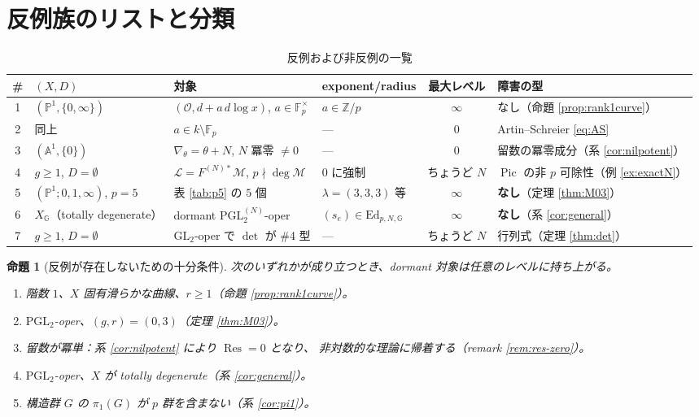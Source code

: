 \documentclass[a4paper,11pt]{ltjsarticle}
\theoremstyle{plain}
\newtheorem{proposition}[theorem]{命題}
\theoremstyle{definition}
\newcommand{\bbA}{\mathbb{A}}
\newcommand{\bbP}{\mathbb{P}}
\newcommand{\bbZ}{\mathbb{Z}}
\newcommand{\bbF}{\mathbb{F}}
\newcommand{\cL}{\mathcal{L}}
\newcommand{\cM}{\mathcal{M}}
\newcommand{\cO}{\mathcal{O}}
\newcommand{\Res}{\operatorname{Res}}
\newcommand{\Pic}{\operatorname{Pic}}
\newcommand{\dlog}{d\!\log}
\begin{document}
\section{反例族のリストと分類}\label{sec:list}

\begin{table}[htbp]
\centering
\caption{反例および非反例の一覧}
\label{tab:examples}
\small
\begin{tabular}{clllcl}
\toprule
\# & $(X,D)$ & 対象 & exponent/radius & 最大レベル & 障害の型\\
\midrule
1 & $(\bbP^1,\{0,\infty\})$ & $(\cO,d+a\,\dlog x)$, $a\in\bbF_p^\times$
  & $a\in\bbZ/p$ & $\infty$ & なし（命題 \ref{prop:rank1curve}）\\[2pt]
2 & 同上 & $a\in k\setminus\bbF_p$ & --- & $0$ & Artin--Schreier \eqref{eq:AS}\\[2pt]
3 & $(\bbA^1,\{0\})$ & $\nabla_\theta=\theta+N$, $N$ 冪零 $\neq0$
  & --- & $0$ & 留数の冪零成分（系 \ref{cor:nilpotent}）\\[2pt]
4 & $g\ge1$, $D=\emptyset$ & $\cL=F^{(N)*}\cM$, $p\nmid\deg\cM$
  & $0$ に強制 & ちょうど $N$ & $\Pic$ の非 $p$ 可除性（例 \ref{ex:exactN}）\\[2pt]
5 & $(\bbP^1;0,1,\infty)$, $p=5$ & 表 \ref{tab:p5} の $5$ 個
  & $\lambda=(3,3,3)$ 等 & $\infty$ & \textbf{なし}（定理 \ref{thm:M03}）\\[2pt]
6 & $X_{\mathbb{G}}$（totally degenerate） & dormant $\mathrm{PGL}_2^{(N)}$-oper
  & $(s_e)\in\mathrm{Ed}_{p,N,\mathbb{G}}$ & $\infty$ & \textbf{なし}（系 \ref{cor:general}）\\[2pt]
7 & $g\ge1$, $D=\emptyset$ & $\mathrm{GL}_2$-oper で $\det$ が \#4 型
  & --- & ちょうど $N$ & 行列式（定理 \ref{thm:det}）\\
\bottomrule
\end{tabular}
\end{table}

\begin{proposition}[反例が存在しないための十分条件]\label{prop:sufficient}
次のいずれかが成り立つとき、dormant 対象は任意のレベルに持ち上がる。
\begin{enumerate}[label=(\alph*),leftmargin=2em]
\item 階数 $1$、$X$ 固有滑らかな曲線、$r\ge1$（命題 \ref{prop:rank1curve}）。
\item $\mathrm{PGL}_2$-oper、$(g,r)=(0,3)$（定理 \ref{thm:M03}）。
\item 留数が冪単：系 \ref{cor:nilpotent} により $\Res=0$ となり、
      非対数的な理論に帰着する（remark \ref{rem:res-zero}）。
\item $\mathrm{PGL}_2$-oper、$X$ が totally degenerate（系 \ref{cor:general}）。
\item 構造群 $G$ の $\pi_1(G)$ が $p$ 群を含まない（系 \ref{cor:pi1}）。
\end{enumerate}
\end{proposition}
\end{document}
